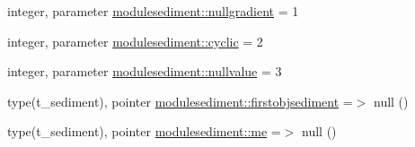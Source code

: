 \begin{DoxyCompactItemize}
integer, parameter \mbox{\hyperlink{namespacemodulesediment_a4d4d024c00a9eac5f794d6a0db4faafd}{modulesediment\+::nullgradient}} = 1
\item 
integer, parameter \mbox{\hyperlink{namespacemodulesediment_ac4670700ca82bb1af30c31085a5b45d4}{modulesediment\+::cyclic}} = 2
\item 
integer, parameter \mbox{\hyperlink{namespacemodulesediment_a43439a1d0c16bbfdb3623215dfa24102}{modulesediment\+::nullvalue}} = 3
\item 
type(t\+\_\+sediment), pointer \mbox{\hyperlink{namespacemodulesediment_ab81913d50f9323da1689b4d47d3c8d48}{modulesediment\+::firstobjsediment}} =$>$ null ()
\item 
type(t\+\_\+sediment), pointer \mbox{\hyperlink{namespacemodulesediment_af3acabb996ebbde62db3847cfe45099c}{modulesediment\+::me}} =$>$ null ()
\end{DoxyCompactItemize}

